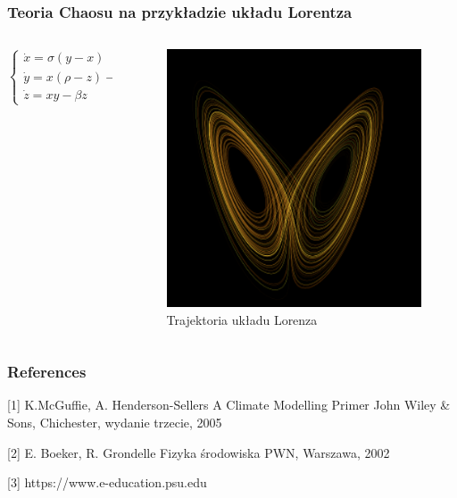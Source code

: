 \documentclass{beamer}
\begin{document}
\begin{frame}
	\frametitle{Teoria Chaosu na przykładzie układu Lorentza}
	\begin{columns}
		\begin{column}{0.5\textwidth}	
			$\begin{cases} \dot{x} = \sigma(y-x)\\ \dot{y} =x(\rho-z)-y \\ \dot{z} = xy-\beta z \end{cases}$
		\end{column}
		\begin{column}{0.5\textwidth}
			\begin{figure}[h]
				\begin{center}
					\includegraphics[width=0.7\linewidth]{images/motyl.png}
					\caption{Trajektoria układu Lorenza}
				\end{center}
			\end{figure}
		\end{column}
		
	\end{columns}
	
\end{frame}



\begin{frame}
	\frametitle{References}
	\footnotesize{
		\begin{thebibliography}{99} %
			[1] K.McGuffie, A. Henderson-Sellers
			\newblock A Climate Modelling Primer
			\newblock John Wiley \& Sons, Chichester, wydanie trzecie, 2005
			
			[2] E. Boeker, R. Grondelle
			\newblock Fizyka środowiska
			\newblock PWN, Warszawa, 2002
			
			[3] https://www.e-education.psu.edu
			
		\end{thebibliography}
	}
\end{frame}
\end{document}
